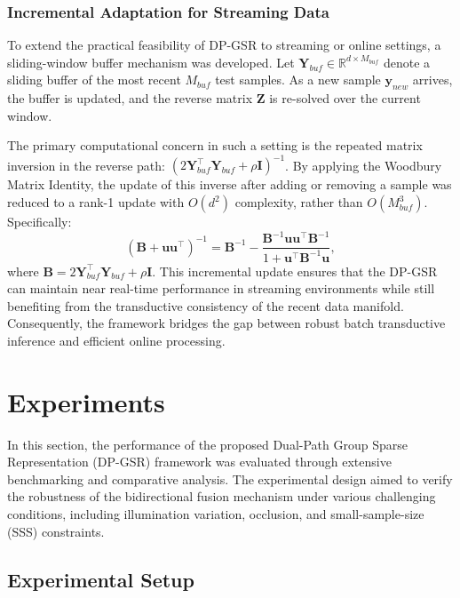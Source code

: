 \documentclass[10pt,comsoc]{IEEEtran}
\begin{document}
\subsubsection{Incremental Adaptation for Streaming Data}
To extend the practical feasibility of DP-GSR to streaming or online settings, a sliding-window buffer mechanism was developed. Let $\mathbf{Y}_{buf} \in \mathbb{R}^{d \times M_{buf}}$ denote a sliding buffer of the most recent $M_{buf}$ test samples. As a new sample $\mathbf{y}_{new}$ arrives, the buffer is updated, and the reverse matrix $\mathbf{Z}$ is re-solved over the current window. 

The primary computational concern in such a setting is the repeated matrix inversion in the reverse path: $(2\mathbf{Y}_{buf}^\top\mathbf{Y}_{buf} + \rho \mathbf{I})^{-1}$. By applying the Woodbury Matrix Identity, the update of this inverse after adding or removing a sample was reduced to a rank-1 update with $O(d^2)$ complexity, rather than $O(M_{buf}^3)$. Specifically:
\begin{equation}
(\mathbf{B} + \mathbf{uu}^\top)^{-1} = \mathbf{B}^{-1} - \frac{\mathbf{B}^{-1}\mathbf{uu}^\top\mathbf{B}^{-1}}{1 + \mathbf{u}^\top\mathbf{B}^{-1}\mathbf{u}},
\end{equation}
where $\mathbf{B} = 2\mathbf{Y}_{buf}^\top\mathbf{Y}_{buf} + \rho \mathbf{I}$. This incremental update ensures that the DP-GSR can maintain near real-time performance in streaming environments while still benefiting from the transductive consistency of the recent data manifold. Consequently, the framework bridges the gap between robust batch transductive inference and efficient online processing.

\section{Experiments}
In this section, the performance of the proposed Dual-Path Group Sparse Representation (DP-GSR) framework was evaluated through extensive benchmarking and comparative analysis. The experimental design aimed to verify the robustness of the bidirectional fusion mechanism under various challenging conditions, including illumination variation, occlusion, and small-sample-size (SSS) constraints.

\subsection{Experimental Setup}
\end{document}
